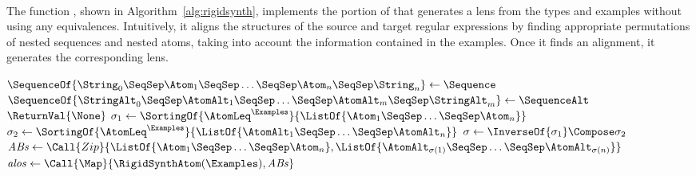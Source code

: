 \documentclass[acmsmall,screen]{acmart}
\begin{document}
\paragraph*{\RigidSynth} 
The function \RigidSynth{}, shown in Algorithm~\ref{alg:rigidsynth},
implements the portion of \SynthLens{} that
generates a lens from the types and examples without using any equivalences.
Intuitively, it aligns the structures of the source and target regular
expressions by finding appropriate permutations of nested sequences
and nested atoms, taking into account the information contained in the
examples.  Once it finds an alignment, it generates the
corresponding lens. 

\begin{algorithm}
  \caption{\RigidSynth}
  \label{alg:rigidsynth}
  \begin{algorithmic}[1]
    \Function{\RigidSynthAtom}{$\Atom{},\AtomAlt{},\Examples$}
    \Switch{$(\Atom{}, \AtomAlt)$}
    \Case {(\UserDef, \UserDefAlt)}
    \If {$\UserDef \AtomLeq^\Examples \UserDefAlt \BooleanAnd \UserDefAlt
      \AtomLeq^\Examples \UserDef$}
    \State \ReturnVal{\SomeOf{\IdentityLensOf{\UserDef}}}
    \Else
    \State \ReturnVal{\None}
    \EndIf
    \EndCase
    \Case {(\StarOf{\DNFRegex},\StarOf{\DNFRegexAlt})}
    \Switch{$\RigidSynth(\DNFRegex,\DNFRegexAlt,\Examples)$}
    \CaseTwo{\SomeOf{\DNFLens}}{\ReturnVal{\IterateLensOf{\DNFLens}}}
    \EndCaseTwo
    \CaseTwo {\None}{$\ReturnVal{\None}$}
    \EndCaseTwo
    \EndSwitch
    \EndCase
    \CaseTwo {\_}{\ReturnVal{\None}}
    \EndCaseTwo
    \EndSwitch
    \EndFunction

    \Statex

    \Function{\RigidSynthSequence}{$\Sequence,\SequenceAlt,\Examples$}
    \State $\SequenceOf{\String_0 \SeqSep \Atom_1 \SeqSep \ldots \SeqSep \Atom_n
      \SeqSep \String_n} \gets
    \Sequence$
    \State $\SequenceOf{\StringAlt_0 \SeqSep \AtomAlt_1 \SeqSep \ldots \SeqSep
      \AtomAlt_m \SeqSep \StringAlt_m} \gets
    \SequenceAlt$
    \State $\ReturnVal{\None}$
    \EndIf
    \State $\sigma_1 \gets \SortingOf{\AtomLeq^\Examples}{\ListOf{\Atom_1
        \SeqSep \ldots \SeqSep \Atom_n}}$
    \State $\sigma_2 \gets \SortingOf{\AtomLeq^\Examples}{\ListOf{\AtomAlt_1
        \SeqSep \ldots \SeqSep \AtomAlt_n}}$
    \State $\sigma \gets \InverseOf{\sigma_1} \Compose \sigma_2$
    \State $\mathit{ABs} \gets
    \Call{Zip}{\ListOf{\Atom_1 \SeqSep \ldots \SeqSep
        \Atom_n},\ListOf{\AtomAlt_{\sigma(1)} \SeqSep \ldots \SeqSep \AtomAlt_{\sigma(n)}}}$
    \State $\mathit{alos} \gets
    \Call{\Map}{\RigidSynthAtom(\Examples),\mathit{ABs}}$
    \EndCaseTwo
    \CaseTwo {\None}{$\ReturnVal{\None}$}
    \EndCaseTwo
    \EndSwitch
    \EndFunction


\end{algorithmic}
\end{algorithm}
\end{document}
